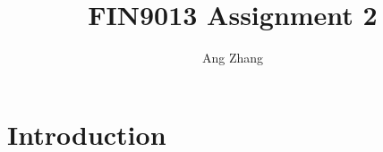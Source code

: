 \documentclass{article}
\title{FIN9013 Assignment 2}
\author{Ang Zhang}
\begin{document}
\maketitle

\singlespacing

\section*{Introduction}
\end{document}
